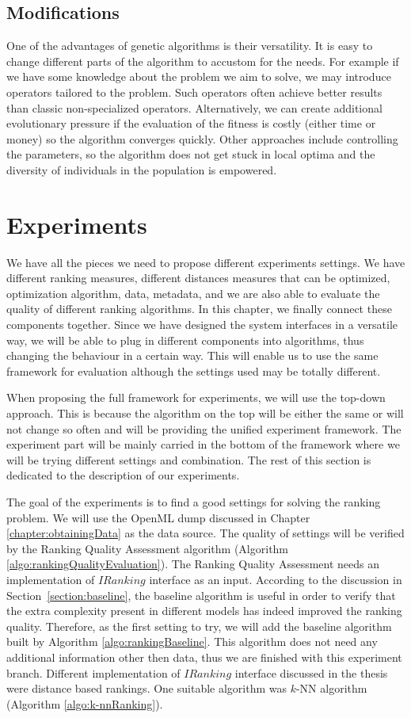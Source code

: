 \subsection{Modifications}
One of the advantages of genetic algorithms is their versatility. It is easy to change different parts of the algorithm to accustom for the needs.
For example if we have some knowledge about the problem we aim to solve, we may introduce operators tailored to the problem. Such operators often achieve better results than classic non-specialized operators.
Alternatively, we can create additional evolutionary pressure if the evaluation of the fitness is costly (either time or money) so the algorithm converges quickly. Other approaches include controlling the parameters, so the algorithm does not get stuck in local optima and the diversity of individuals in the population is empowered.

\section{Experiments}
\label{section:firstExperiments}
We have all the pieces we need to propose different experiments settings. We have different ranking measures, different distances measures that can be optimized, optimization algorithm, data, metadata, and we are also able to evaluate the quality of different ranking algorithms. In this chapter, we finally connect these components together.
Since we have designed the system interfaces in a versatile way, we will be able to plug in different components into algorithms, thus changing the behaviour in a certain way. This will enable us to use the same framework for evaluation although the settings used may be totally different.

When proposing the full framework for experiments, we will use the top-down approach. This is because the algorithm on the top will be either the same or will not change so often and will be providing the unified experiment framework. The experiment part will be mainly carried in the bottom of the framework where we will be trying different settings and combination. The rest of this section is dedicated to the description of our experiments.

The goal of the experiments is to find a good settings for solving the ranking problem. We will use the OpenML dump discussed in Chapter \ref{chapter:obtainingData} as the data source. The quality of settings will be verified by the Ranking Quality Assessment algorithm (Algorithm \ref{algo:rankingQualityEvaluation}). The Ranking Quality Assessment needs an implementation of $IRanking$ interface as an input. According to the discussion in Section~\ref{section:baseline}, the baseline algorithm is useful in order to verify that the extra complexity present in different models has indeed improved the ranking quality. Therefore, as the first setting to try, we will add the baseline algorithm built by Algorithm \ref{algo:rankingBaseline}. This algorithm does not need any additional information other then data, thus we are finished with this experiment branch. Different implementation of $IRanking$ interface discussed in the thesis were distance based rankings. One suitable algorithm was $k$-NN algorithm (Algorithm \ref{algo:k-nnRanking}).

